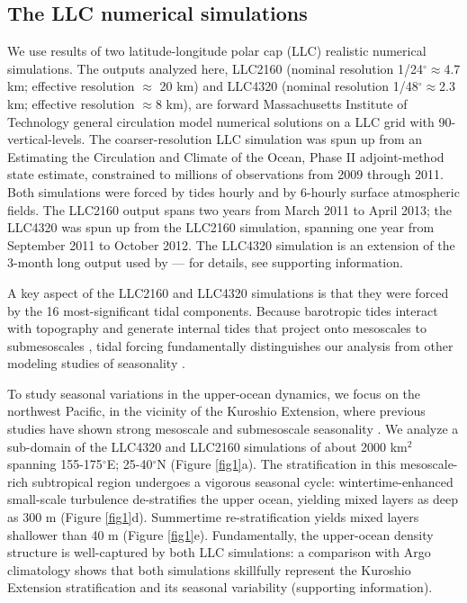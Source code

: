 \documentclass[grl]{agutex2015}
\begin{document}
\begin{article}
\section{The LLC numerical simulations}
We use results of two latitude-longitude polar cap (LLC)
realistic numerical simulations. The outputs
analyzed here, LLC2160 (nominal resolution 1/24$^\circ$$\approx$4.7 km;
effective resolution $\approx$ 20 km) and LLC4320
(nominal resolution 1/48$^\circ$$\approx$2.3 km;
effective resolution $\approx$8 km),   are
forward Massachusetts Institute of Technology general circulation model \citep[MITgcm; ][]{marshall_etal1997}
numerical solutions on a LLC grid  \citep{forget_etal2015} with
90-vertical-levels. The coarser-resolution LLC simulation was
spun up from an Estimating the Circulation and Climate of the Ocean, Phase II \citep[ECCO2; ][]{menemenlis_etal2008}
adjoint-method state estimate, constrained to millions
of observations from 2009 through 2011. Both simulations were forced by
tides hourly and by 6-hourly surface atmospheric fields. The LLC2160
output spans two years from March 2011 to April 2013; the LLC4320 was spun up from
the LLC2160 simulation, spanning one year from September 2011 to October 2012.
The LLC4320 simulation is an extension of the 3-month long output used by
\citet{rocha_etal2016} --- for details, see supporting information.

A key aspect of the LLC2160 and LLC4320 simulations is that they were forced by
the 16 most-significant tidal components.
Because barotropic tides interact with topography and generate internal
tides that project onto mesoscales to submesoscales
\citep[e.g., ][]{rocha_etal2016}, tidal forcing fundamentally distinguishes our analysis
from other modeling studies of seasonality \citep{sasaki_etal2014,qiu_etal2014}.

To study seasonal variations in the upper-ocean dynamics, we focus on the northwest
Pacific, in the vicinity of the Kuroshio
Extension, where previous studies have shown strong mesoscale and submesoscale seasonality
\citep{sasaki_etal2014,qiu_etal2014}.
We analyze a sub-domain of the LLC4320 and LLC2160 simulations of about 2000 km$^2$
spanning 155-175$^\circ$E; 25-40$^\circ$N (Figure \ref{fig1}a). The stratification
in this mesoscale-rich subtropical region undergoes a vigorous seasonal cycle: wintertime-enhanced
small-scale turbulence de-stratifies the upper ocean, yielding mixed layers
as deep as 300 m (Figure \ref{fig1}d). Summertime re-stratification yields mixed layers shallower
than 40 m (Figure \ref{fig1}e).
Fundamentally, the upper-ocean density structure is well-captured by both LLC simulations:
a comparison with Argo climatology shows that both simulations skillfully represent the Kuroshio
Extension stratification and its seasonal variability  (supporting information).


\end{article}
\end{document}
